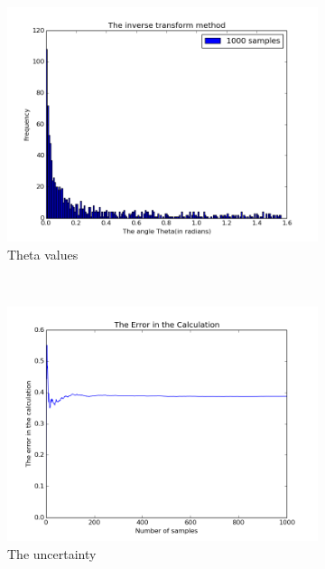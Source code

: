\begin{figure}
    \centering
    \begin{subfigure}[b]{0.5\textwidth}
        \includegraphics[width=\textwidth]{images/inverse_method.png}
        \caption{Theta values}
        \label{fig2}
    \end{subfigure}
    ~ %
    \begin{subfigure}[b]{0.5\textwidth}
        \includegraphics[width=\textwidth]{images/uncertainity_.png}
        \caption{The uncertainty}
        \label{fig2}
    \end{subfigure}
    \label{Fig:2}
\caption{}
\end{figure}

